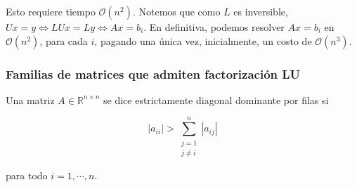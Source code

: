 Esto requiere tiempo $\mathcal{O}(n^2)$. Notemos que como $L$ es inversible, $Ux = y \Leftrightarrow LUx = Ly \Leftrightarrow Ax = b_i$. En definitiva, podemos resolver $Ax = b_i$ en $\mathcal{O}(n^2)$, para cada $i$, pagando una única vez, inicialmente, un costo de $\mathcal{O}(n^3)$.

\subsubsection{Familias de matrices que admiten factorización LU}

\begin{defi}
Una matriz $A \in \mathbb{R}^{n \times n}$ se dice estrictamente diagonal dominante por filas si

\[
|a_{ii}| > \sum_{\substack{j = 1\\ j \neq i}}^n |a_{ij}|
\]

para todo $i = 1, \cdots, n$.
\end{defi}


